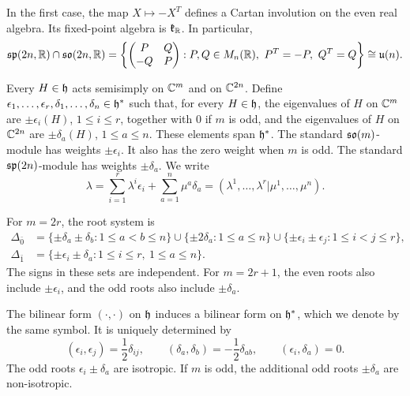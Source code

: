 In the first case, the map $X\mapsto-X^T$ defines a
Cartan involution on the even real algebra. Its
fixed-point algebra is $\kk_{\RR}$. In particular,
\begin{equation}
\begin{aligned}
\sp(2n,\RR)\cap\so(2n,\RR)
=
\left\{
\begin{pmatrix}P&Q\\-Q&P\end{pmatrix}:
P,Q\in M_n(\RR),\
P^T=-P,\ Q^T=Q
\right\}\cong\mathfrak u(n).
\end{aligned}
\end{equation}

 


Every $H\in\hh$ acts semisimply on $\CC^m$ and on $\CC^{2n}$. Define $\epsilon_1,\ldots,\epsilon_r,\delta_1,\ldots,\delta_n\in\hh^*$ such that, for every $H\in\hh$, the eigenvalues of $H$ on $\CC^m$ are $\pm\epsilon_i(H)$, $1\leq i\leq r$, together with $0$ if $m$ is odd, and the eigenvalues of $H$ on $\CC^{2n}$ are $\pm\delta_a(H)$, $1\leq a\leq n$.
These elements span $\hh^{\ast}$. The standard $\so(m)$-module has weights
$\pm\epsilon_i$. It also has the zero weight
when $m$ is odd. The standard $\sp(2n)$-module
has weights $\pm\delta_a$. We write
\begin{equation}
\lambda
=
\sum_{i=1}^r\lambda^i\epsilon_i
+\sum_{a=1}^n\mu^a\delta_a
=
(\lambda^1,\ldots,\lambda^r
\vert\mu^1,\ldots,\mu^n).
\end{equation}

For $m=2r$, the root system is
\begin{equation}
\begin{aligned}
\Delta_{\bar0}
&=
\{\pm\delta_a\pm\delta_b:1\leq a<b\leq n\}
\cup\{\pm2\delta_a:1\leq a\leq n\}\cup
\{\pm\epsilon_i\pm\epsilon_j:1\leq i<j\leq r\},\\
\Delta_{\bar1}
&=
\{\pm\epsilon_i\pm\delta_a:
1\leq i\leq r,\ 1\leq a\leq n\}.
\end{aligned}
\label{eq:osp-roots}
\end{equation}
The signs in these sets are independent. For $m=2r+1$, the even roots also include
$\pm\epsilon_i$, and the odd roots also include
$\pm\delta_a$.

The bilinear form $(\cdot,\cdot)$ on $\hh$ induces a bilinear form on $\hh^\ast$, which we denote by the same symbol. It is uniquely determined by
\begin{equation}
(\epsilon_i,\epsilon_j)=\frac12\delta_{ij},
\qquad
(\delta_a,\delta_b)=-\frac12\delta_{ab},
\qquad
(\epsilon_i,\delta_a)=0.
\end{equation}
The odd roots $\epsilon_i\pm\delta_a$ are isotropic. If $m$ is odd, the additional odd roots $\pm\delta_a$ are non-isotropic.

